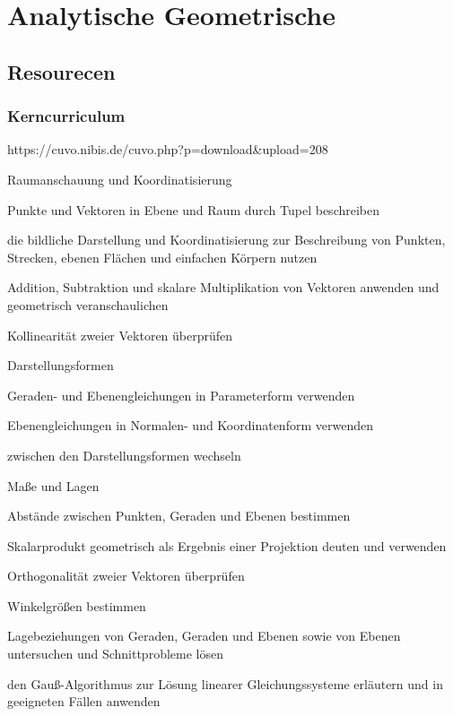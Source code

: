 \chapter{Analytische Geometrische}

\section{Resourecen}

\subsection{Kerncurriculum}

https://cuvo.nibis.de/cuvo.php?p=download&upload=208

\startitemize[packed]
\item Raumanschauung und Koordinatisierung
\startitemize[packed]
  \item Punkte und Vektoren in Ebene und Raum durch Tupel beschreiben
  \item die bildliche Darstellung und Koordinatisierung zur Beschreibung von Punkten, Strecken, ebenen Flächen und einfachen Körpern nutzen
  \item Addition, Subtraktion und skalare Multiplikation von Vektoren anwenden und geometrisch veranschaulichen
  \item Kollinearität zweier Vektoren überprüfen
\stopitemize
\item Darstellungsformen
\startitemize[packed]
  \item Geraden- und Ebenengleichungen in Parameterform verwenden
  \item Ebenengleichungen in Normalen- und Koordinatenform verwenden
  \item zwischen den Darstellungsformen wechseln
\stopitemize
\item Maße und Lagen
\startitemize[packed]
  \item Abstände zwischen Punkten, Geraden und Ebenen bestimmen
  \item Skalarprodukt geometrisch als Ergebnis einer Projektion deuten und verwenden
  \item Orthogonalität zweier Vektoren überprüfen
  \item Winkelgrößen bestimmen
  \item Lagebeziehungen von Geraden, Geraden und Ebenen sowie von Ebenen untersuchen und Schnittprobleme lösen
  \item den Gauß-Algorithmus zur Lösung linearer Gleichungssysteme erläutern und in geeigneten Fällen anwenden
\stopitemize
\stopitemize

